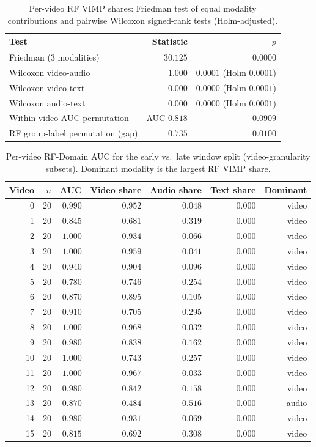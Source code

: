 \begin{table}[ht]\centering
\caption{Per-video RF VIMP shares: Friedman test of equal modality contributions and pairwise Wilcoxon signed-rank tests (Holm-adjusted).}
\label{tab:msrvtt-mm-pervideo-tests}
\small
\begin{tabular}{@{}l r r@{}}\toprule
Test & Statistic & $p$ \\
\midrule
Friedman (3 modalities) & $30.125$ & $0.0000$ \\
Wilcoxon video-audio & $1.000$ & $0.0001$ (Holm $0.0001$) \\
Wilcoxon video-text & $0.000$ & $0.0000$ (Holm $0.0001$) \\
Wilcoxon audio-text & $0.000$ & $0.0000$ (Holm $0.0001$) \\
Within-video AUC permutation & AUC $0.818$ & $0.0909$ \\
RF group-label permutation (gap) & $0.735$ & $0.0100$ \\
\bottomrule\end{tabular}\end{table}

\begin{table}[ht]\centering
\caption{Per-video RF-Domain AUC for the early vs.\ late window split (video-granularity subsets). Dominant modality is the largest RF VIMP share.}
\label{tab:msrvtt-mm-pervideo-auc}
\small
\begin{tabular}{@{}r r r r r r r@{}}\toprule
Video & $n$ & AUC & Video share & Audio share & Text share & Dominant \\
\midrule
0 & 20 & $0.990$ & $0.952$ & $0.048$ & $0.000$ & video \\
1 & 20 & $0.845$ & $0.681$ & $0.319$ & $0.000$ & video \\
2 & 20 & $1.000$ & $0.934$ & $0.066$ & $0.000$ & video \\
3 & 20 & $1.000$ & $0.959$ & $0.041$ & $0.000$ & video \\
4 & 20 & $0.940$ & $0.904$ & $0.096$ & $0.000$ & video \\
5 & 20 & $0.780$ & $0.746$ & $0.254$ & $0.000$ & video \\
6 & 20 & $0.870$ & $0.895$ & $0.105$ & $0.000$ & video \\
7 & 20 & $0.910$ & $0.705$ & $0.295$ & $0.000$ & video \\
8 & 20 & $1.000$ & $0.968$ & $0.032$ & $0.000$ & video \\
9 & 20 & $0.980$ & $0.838$ & $0.162$ & $0.000$ & video \\
10 & 20 & $1.000$ & $0.743$ & $0.257$ & $0.000$ & video \\
11 & 20 & $1.000$ & $0.967$ & $0.033$ & $0.000$ & video \\
12 & 20 & $0.980$ & $0.842$ & $0.158$ & $0.000$ & video \\
13 & 20 & $0.870$ & $0.484$ & $0.516$ & $0.000$ & audio \\
14 & 20 & $0.980$ & $0.931$ & $0.069$ & $0.000$ & video \\
15 & 20 & $0.815$ & $0.692$ & $0.308$ & $0.000$ & video \\
\bottomrule\end{tabular}\end{table}
